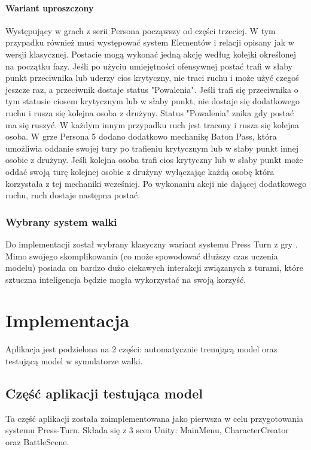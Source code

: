 \documentclass{SGGW-thesis}
\begin{document}
\subsubsection{Wariant uproszczony}
Występujący w grach z serii Persona począwszy od części trzeciej. W tym przypadku również musi występować system Elementów i relacji opisany jak w wersji klasycznej. Postacie mogą wykonać jedną akcję według kolejki określonej na początku fazy. Jeśli po użyciu umiejętności ofensywnej postać trafi w słaby punkt przeciwnika lub uderzy cios krytyczny,
nie traci ruchu i może użyć czegoś jeszcze raz, a przeciwnik dostaje status "Powalenia". Jeśli trafi się przeciwnika o tym statusie ciosem krytycznym lub w słaby punkt, nie dostaje się dodatkowego ruchu i rusza się kolejna osoba z drużyny. Status "Powalenia" znika gdy postać ma się ruszyć. W każdym innym przypadku ruch jest tracony i rusza się kolejna osoba. 
W grze Persona 5 dodano dodatkowo mechanikę Baton Pass, która umożliwia oddanie swojej tury po trafieniu krytycznym lub w słaby punkt innej osobie z drużyny. Jeśli kolejna osoba trafi cios krytyczny lub w słaby punkt może oddać swoją turę kolejnej osobie z drużyny wyłączając każdą osobę która korzystała z tej mechaniki wcześniej. Po wykonaniu akcji nie dającej dodatkowego ruchu, 
ruch dostaje następna postać.


\subsection*{Wybrany system walki}
Do implementacji został wybrany klasyczny wariant systemu Press Turn z gry \cite{SMT3}. Mimo swojego skomplikowania (co może spowodować dłuższy czas uczenia modelu) posiada on bardzo dużo ciekawych interakcji związanych z turami, które sztuczna inteligencja będzie mogła wykorzystać na swoją korzyść.


\chapter{Implementacja}
Aplikacja jest podzielona na 2 części: automatycznie trenującą model oraz testującą model w symulatorze walki.


\section{Część aplikacji testująca model}
Ta część aplikacji została zaimplementowana jako pierwsza w celu przygotowania systemu Press-Turn. Składa się z 3 scen Unity: MainMenu, CharacterCreator oraz BattleScene.
\end{document}
